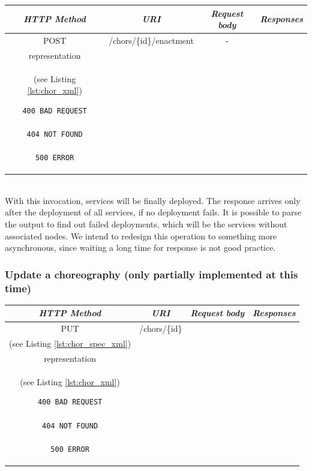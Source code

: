 \documentclass[a4paper, 10pt]{article}
\begin{document}
\begin{tabular}{|c|c|c|c|}
\hline 
\itshape{HTTP Method} & \itshape{URI} & \itshape{Request body} & \itshape{Responses} \\ 
\hline 
POST & /chors/\{id\}/enactment & - &
\begin{minipage}{2in}
\begin{verbatim}

200 OK
location = "/chors/{id}"
Body: 
\end{verbatim}
\verb!Choreography! XML \\
representation \\
(see Listing \ref{lst:chor_xml})
\begin{verbatim}
400 BAD REQUEST

404 NOT FOUND

500 ERROR

\end{verbatim}
\end{minipage} 
\\ 
\hline 
\end{tabular} \\

With this invocation, services will be finally deployed.
The response arrives only after the deployment of all services, if no deployment fails.
It is possible to parse the output to find out failed deployments, which will be the services without associated nodes.
We intend to redesign this operation to something more asynchronous, since waiting a long time for response is not good practice.

\subsubsection*{Update a choreography (only partially implemented at this time)}

\begin{tabular}{|c|c|c|c|}
\hline 
\itshape{HTTP Method} & \itshape{URI} & \itshape{Request body} & \itshape{Responses} \\ 
\hline 
PUT & /chors/\{id\} & 

\begin{minipage}{2in}
\verb!ChorSpec! XML representation \\ 
(see Listing \ref{lst:chor_spec_xml})
\end{minipage} 
&
\begin{minipage}{2in}
\begin{verbatim}

200 OK
location = "/chors/{id}"
Body: 
\end{verbatim}
\verb!Choreography! XML \\
representation \\
(see Listing \ref{lst:chor_xml})
\begin{verbatim}
400 BAD REQUEST

404 NOT FOUND

500 ERROR

\end{verbatim}
\end{minipage} 
\\ 
\hline 
\end{tabular} \\
\end{document}
